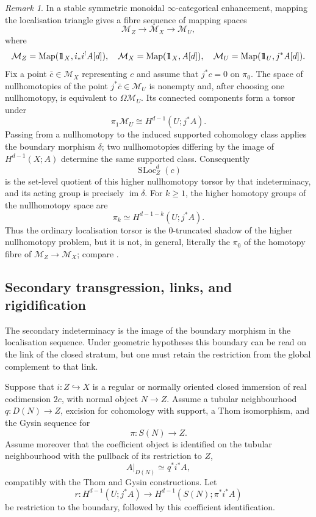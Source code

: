 \documentclass[10pt,a4paper,dvipsnames,x11names]{amsart}
\newcommand{\one}{1\hskip-3.5pt1}
\newcommand{\SLoc}{\operatorname{SLoc}}
\numberwithin{equation}{section}
\theoremstyle{plain}
\theoremstyle{definition}
\theoremstyle{remark}
\newtheorem{remark}[remark]{Remark}
\begin{document}
\begin{remark}\label{rem:higher-localization-torsor}
In a stable symmetric monoidal $\infty$-categorical enhancement, mapping the localisation triangle gives a fibre sequence of mapping spaces
\[
\mathcal M_Z\longrightarrow\mathcal M_X\longrightarrow\mathcal M_U,
\]
where
\[
\mathcal M_Z=\operatorname{Map}(\one_X,i_*i^!A[d]),\quad
\mathcal M_X=\operatorname{Map}(\one_X,A[d]),\quad
\mathcal M_U=\operatorname{Map}(\one_U,j^*A[d]).
\]
Fix a point $\bar c\in\mathcal M_X$ representing $c$ and assume that $j^*c=0$ on $\pi_0$.  The space of nullhomotopies of the point $j^*\bar c\in\mathcal M_U$ is nonempty and, after choosing one nullhomotopy, is equivalent to $\Omega\mathcal M_U$.  Its connected components form a torsor under
\[
\pi_1\mathcal M_U\cong H^{d-1}(U;j^*A).
\]
Passing from a nullhomotopy to the induced supported cohomology class applies the boundary morphism $\delta$; two nullhomotopies differing by the image of $H^{d-1}(X;A)$ determine the same supported class.  Consequently
\[
\SLoc_Z^d(c)
\]
is the set-level quotient of this higher nullhomotopy torsor by that indeterminacy, and its acting group is precisely $\operatorname{im}\delta$.  For $k\geq1$, the higher homotopy groups of the nullhomotopy space are
\[
\pi_k\simeq H^{d-1-k}(U;j^*A).
\]
Thus the ordinary localisation torsor is the $0$-truncated shadow of the higher nullhomotopy problem, but it is not, in general, literally the $\pi_0$ of the homotopy fibre of $\mathcal M_Z\to\mathcal M_X$; compare \cite{LurieStableInfinity,CisinskiDeglise}.
\end{remark}

\subsection{Secondary transgression, links, and rigidification}\label{subsec:boundary-link-transgression}

The secondary indeterminacy is the image of the boundary morphism in the localisation sequence.  Under geometric hypotheses this boundary can be read on the link of the closed stratum, but one must retain the restriction from the global complement to that link.

Suppose that $i:Z\hookrightarrow X$ is a regular or normally oriented closed immersion of real codimension $2c$, with normal object $N\to Z$.  Assume a tubular neighbourhood $q:D(N)\to Z$, excision for cohomology with support, a Thom isomorphism, and the Gysin sequence for
\[
\pi:S(N)\longrightarrow Z.
\]
Assume moreover that the coefficient object is identified on the tubular neighbourhood with the pullback of its restriction to $Z$,
\[
A|_{D(N)}\simeq q^*i^*A,
\]
compatibly with the Thom and Gysin constructions.  Let
\[
r:H^{d-1}(U;j^*A)\longrightarrow H^{d-1}(S(N);\pi^*i^*A)
\]
be restriction to the boundary, followed by this coefficient identification.
\end{document}
